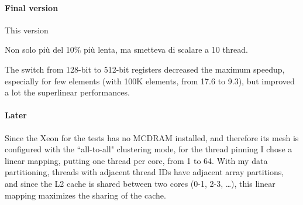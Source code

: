 \paragraph{Final version}
This version 

\bigbreak

Non solo più del 10\% più lenta, ma smetteva di scalare a 10 thread.
\bigbreak

The switch from 128-bit to 512-bit registers decreased the maximum speedup, especially for few elements (with 100K elements, from 17.6 to 9.3), but improved a lot the superlinear performances.

\paragraph{Later}
Since the Xeon for the tests has no MCDRAM installed, and therefore its mesh is configured with the ``all-to-all" clustering mode, for the thread pinning I chose a linear mapping, putting one thread per core, from 1 to 64. With my data partitioning, threads with adjacent thread IDs have adjacent array partitions, and since the L2 cache is shared between two cores (0-1, 2-3, \dots), this linear mapping maximizes the sharing of the cache.
